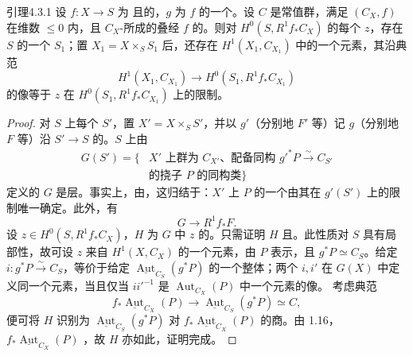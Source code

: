 \begin{SGAresult}{引理}{4.3.1}
设 $f:X\to S$ 为 且的，$g$ 为 $f$ 的一个。设 $C$ 是常值群，满足 $(C_X,f)$ 在维数 $\leq0$ 内，且 $C_X$-所成的叠经 $f$ 的。则对 $H^0(S,R^1f_*C_X)$ 的每个 $z$，存在 $S$ 的一个 $S_1$；置 $X_1=X\times_S S_1$ 后，还存在 $H^1(X_1,C_{X_1})$ 中的一个元素，其沿典范
\[H^1(X_1,C_{X_1})\longrightarrow H^0(S_1,R^1f_*C_{X_1})\]
的像等于 $z$ 在 $H^0(S_1,R^1f_*C_{X_1})$ 上的限制。
\end{SGAresult}
\begin{proof}
对 $S$ 上每个 $S'$，置 $X'=X\times_S S'$，并以 $g'$（分别地 $F'$ 等）记 $g$（分别地 $F$ 等）沿 $S'\to S$ 的。$S$ 上由
\[
\begin{aligned}
G(S')=\{&X'\text{ 上群为 }C_{X'}\text{、配备同构 }g'^*P\xrightarrow{\sim}C_{S'}\\
&\text{的挠子 }P\text{ 的同构类}\}
\end{aligned}
\]
定义的 $G$ 是层。事实上，由，这归结于：$X'$ 上 $P$ 的一个由其在 $g'(S')$ 上的限制唯一确定。此外，有
\[G\longrightarrow R^1f_*F.\]
设 $z\in H^0(S,R^1f_*C_X)$，$H$ 为 $G$ 中 $z$ 的。只需证明 $H$ 且。此性质对 $S$ 具有局部性，故可设 $z$ 来自 $H^1(X,C_X)$ 的一个元素，由 $P$ 表示，且 $g^*P\simeq C_S$。给定 $i:g^*P\xrightarrow{\sim}C_S$，等价于给定 $\underline{\operatorname{Aut}}_{C_S}(g^*P)$ 的一个整体；两个 $i,i'$ 在 $G(X)$ 中定义同一个元素，当且仅当 $ii'^{-1}$ 是 $\operatorname{Aut}_{C_X}(P)$ 中一个元素的像。
考虑典范
\[f_*\underline{\operatorname{Aut}}_{C_X}(P)\longrightarrow\underline{\operatorname{Aut}}_{C_S}(g^*P)\simeq C,\]
便可将 $H$ 识别为 $\underline{\operatorname{Aut}}_{C_S}(g^*P)$ 对 $f_*\underline{\operatorname{Aut}}_{C_X}(P)$ 的商。由 1.16，$f_*\underline{\operatorname{Aut}}_{C_X}(P)$ ，故 $H$ 亦如此，证明完成。
\end{proof}

